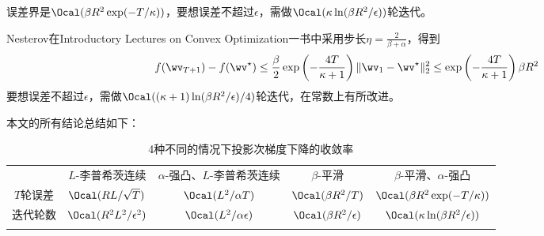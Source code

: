 \documentclass{ctexart}
\begin{document}
\begin{remark}
    误差界是$\Ocal(\beta R^2 \exp(-T/\kappa))$，要想误差不超过$\epsilon$，需做$\Ocal(\kappa \ln (\beta R^2/\epsilon))$轮迭代。
\end{remark}

\begin{remark}
    Nesterov在Introductory Lectures on Convex Optimization一书中采用步长$\eta = \frac{2}{\beta+\alpha}$，得到
    \begin{align*}
        f(\wv_{T+1}) - f(\wv^\star) \le \frac{\beta}{2} \exp \left( -\frac{4T}{\kappa+1} \right) \| \wv_1 - \wv^\star \|_2^2 \le \exp \left( -\frac{4T}{\kappa+1} \right) \beta R^2
    \end{align*}
    要想误差不超过$\epsilon$，需做$\Ocal((\kappa+1) \ln (\beta R^2/\epsilon) / 4)$轮迭代，在常数上有所改进。
\end{remark}

本文的所有结论总结如下：
\begin{table}[ht]
    \centering
    \caption{4种不同的情况下投影次梯度下降的收敛率}
    \begin{tabular}{ccccc}
        \hline \hline \noalign{\smallskip}
               & $L$-李普希茨连续                  & $\alpha$-强凸、$L$-李普希茨连续       & $\beta$-平滑                    & $\beta$-平滑、$\alpha$-强凸                   \\
        \noalign{\smallskip} \hline \noalign{\smallskip}
        $T$轮误差 & $\Ocal(RL/\sqrt{T})$        & $\Ocal(L^2/\alpha T)$        & $\Ocal(\beta R^2/T)$          & $\Ocal(\beta R^2 \exp(-T/\kappa))$       \\
        迭代轮数   & $\Ocal(R^2 L^2/\epsilon^2)$ & $\Ocal(L^2/\alpha \epsilon)$ & $\Ocal(\beta R^2 / \epsilon)$ & $\Ocal(\kappa \ln (\beta R^2/\epsilon))$ \\
        \noalign{\smallskip} \hline \hline
    \end{tabular}
\end{table}
\end{document}
